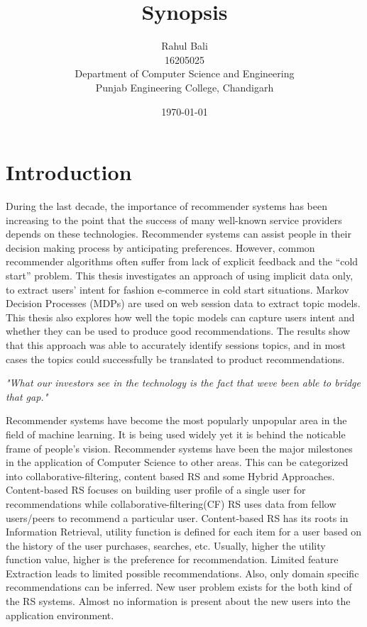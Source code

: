 \documentclass[10pt,a4paper]{article}
\title{\textbf{Synopsis}}
\author{Rahul Bali\\16205025\\Department of Computer Science and Engineering\\Punjab Engineering College, Chandigarh}
\date{\today}
\begin{document}
	\maketitle

	\section{Introduction}
	During the last decade, the importance of recommender systems has been increasing to the point that the success of many well-known service providers depends on these technologies. Recommender systems can assist people in their decision making process by anticipating preferences. However, common recommender algorithms often suffer from lack of explicit feedback and the “cold start” problem. This thesis investigates an approach of using implicit data only, to extract users’ intent for fashion e-commerce in cold start situations. Markov Decision Processes (MDPs) are used on web session data to extract topic models. This thesis also explores how well the topic models can capture users intent and whether they can be used to produce good recommendations. The results show that this approach was able to accurately identify sessions topics, and in most cases the topics could successfully be translated to product recommendations.

	\textit{"What our investors see in the technology is the fact that we\’ve been able to bridge that gap."}

	Recommender systems have become the most popularly unpopular area in the field of machine learning. It is being used widely yet it is behind the noticable frame of people's vision.
	Recommender systems have been the major milestones in the application of Computer Science to
	other areas. This can be categorized into collaborative-filtering, content based RS and some Hybrid
	Approaches.
Content-based RS focuses on building user profile of a single user for recommendations while
collaborative-filtering(CF) RS uses data from fellow users/peers to recommend a particular user.
Content-based RS has its roots in Information Retrieval, utility function is defined for each item for a
user based on the history of the user purchases, searches, etc. Usually, higher the utility function
value, higher is the preference for recommendation. Limited feature Extraction leads to limited
possible recommendations. Also, only domain specific recommendations can be inferred. New user
problem exists for the both kind of the RS systems. Almost no information is present about the new
users into the application environment.\\
\end{document}
